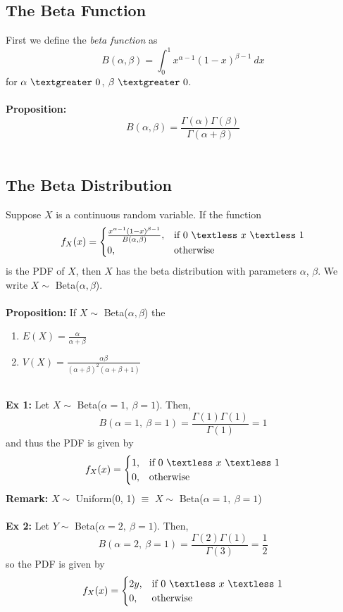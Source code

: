 \documentclass{article}
\newcommand{\ti}[1]{\textit{#1}}
\newcommand{\lt}{\textless}
\newcommand{\gt}{\textgreater}
\newcommand{\Ga}{\Gamma}
\newcommand{\al}{\alpha}
\newcommand{\be}{\beta}
\begin{document}
\subsection{The Beta Function}
First we define the \ti{beta function} as
\[ B(\al, \be) = \int_{0}^{1} x^{\al -1}(1-x)^{\be -1}\ dx\]
for $\al\ \gt\ 0$, $\be\ \gt\ 0$.\\\\
\textbf{Proposition:}
\[B(\al, \be) = \frac{\Ga(\al)\Ga(\be)}{\Ga(\al + \be)}\]\\
\subsection{The Beta Distribution}
Suppose $X$ is a continuous random variable. If the function
\[
f_{X}(x) =
\begin{cases}
	\frac{x^{\al-1}(1-x)^{\be-1}}{B(\al, \be)}, &\text{if}\ 0\ \lt\ x\ \lt\ 1\\
	0, &\text{otherwise}
\end{cases}
\]
is the PDF of $X$, then $X$ has the beta distribution with parameters $\al$, $\be$. We write $X \sim$ Beta($\al, \be$).\\\\
\textbf{Proposition:} If $X \sim$ Beta($\al, \be$) the
\begin{enumerate}
	\item $E(X) = \frac{\al}{\al + \be}$
	\item $V(X) = \frac{\al\be}{(\al + \be)^{2}(\al + \be +1)}$
\end{enumerate}
\ \\
\textbf{Ex 1:} Let $X \sim$ Beta($\al=1,\ \be =1$). Then,
\[B(\al=1,\ \be =1) = \frac{\Ga(1)\Ga(1)}{\Ga(1)} = 1\]
and thus the PDF is given by
\[
f_{X}(x) =
\begin{cases}
	1, &\text{if}\ 0\ \lt\ x\ \lt\ 1\\
	0, &\text{otherwise}
\end{cases}
\]
\textbf{Remark:} $X \sim$ Uniform(0, 1) $\equiv$ $X \sim$ Beta($\al=1,\ \be =1$)\\\\
\textbf{Ex 2:} Let $Y \sim$ Beta($\al=2,\ \be =1$). Then,
\[B(\al=2,\ \be =1) = \frac{\Ga(2)\Ga(1)}{\Ga(3)} = \frac{1}{2}\]
so the PDF is given by
\[
f_{X}(x) =
\begin{cases}
	2y, &\text{if}\ 0\ \lt\ x\ \lt\ 1\\
	0, &\text{otherwise}
\end{cases}
\]
\newpage

\end{document}
